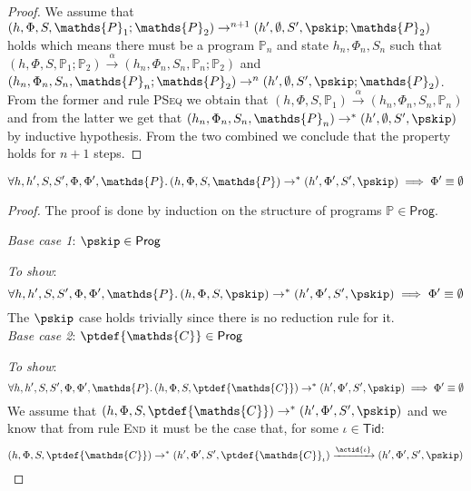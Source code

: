 \begin{lem}
{\begin{proof}
	We assume that $(h, \Phi, S, \mathds{P}_1; \mathds{P}_2) \rightarrow^{n+1} (h', \emptyset, S', \pskip; \mathds{P}_2)$ holds which means there must be a program $\mathds{P}_n$ and state $h_n, \Phi_n, S_n$ such that $(h, \Phi, S, \mathds{P}_1; \mathds{P}_2) \xrightarrow{\alpha} (h_n, \Phi_n, S_n, \mathds{P}_n; \mathds{P}_2)$ and $(h_n, \Phi_n, S_n, \mathds{P}_n; \mathds{P}_2) \rightarrow^{n} (h', \emptyset, S', \pskip ; \mathds{P}_2)$. From the former and rule \textsc{PSeq} we obtain that $(h, \Phi, S, \mathds{P}_1) \xrightarrow{\alpha} (h_n, \Phi_n, S_n, \mathds{P}_n)$ and from the latter we get that $(h_n, \Phi_n, S_n, \mathds{P}_n) \rightarrow^* (h', \emptyset, S', \pskip)$ by inductive hypothesis. From the two combined we conclude that the property holds for $n + 1$ steps.
	\end{proof}
	}
\end{lem}

\begin{lem}
	\label{ref:phiemp}
	\[
		\forall h, h', S, S', \Phi, \Phi', \mathds{P} \ldotp
		(h, \Phi, S, \mathds{P}) \rightarrow^* (h', \Phi', S', \pskip) \implies \Phi' \equiv \emptyset
	\]
	{\parindent0pt
	\begin{proof}
		The proof is done by induction on the structure of programs $\mathds{P} \in \mathsf{Prog}$.
		
		\textit{Base case 1}: $\pskip \in \mathsf{Prog}$
		
		\textit{To show}:
		\[
			\forall h, h', S, S', \Phi, \Phi', \mathds{P} \ldotp
			(h, \Phi, S, \pskip) \rightarrow^* (h', \Phi', S', \pskip) \implies \Phi' \equiv \emptyset
		\]
		The $\pskip$ case holds trivially since there is no reduction rule for it. \\
		
		\textit{Base case 2}: $\ptdef{\mathds{C}} \in \mathsf{Prog}$
		
		\textit{To show}:
		\[
			\forall h, h', S, S', \Phi, \Phi', \mathds{P} \ldotp
			(h, \Phi, S, \ptdef{\mathds{C}}) \rightarrow^* (h', \Phi', S', \pskip) \implies \Phi' \equiv \emptyset
		\]
		We assume that $(h, \Phi, S, \ptdef{\mathds{C}}) \rightarrow^* (h', \Phi', S', \pskip)$ and we know that from rule \textsc{End} it must be the case that, for some $\iota \in \mathsf{Tid}$:
		\[
			(h, \Phi, S, \ptdef{\mathds{C}}) \rightarrow^* (h', \Phi', S', \ptdef{\mathds{C}}_\iota)
			\xrightarrow{\actid{\iota}}
			(h', \Phi', S', \pskip)
		\]
	\end{proof}
	}
\end{lem}

